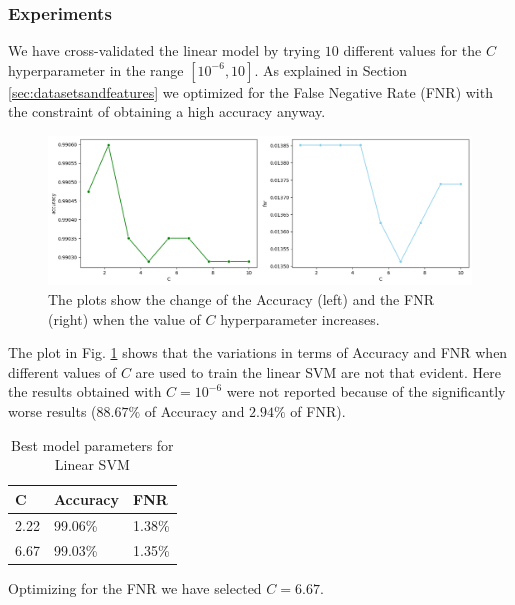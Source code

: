 \documentclass[twocolumn, switch]{article} %
\newcommand\x{0.7}
\begin{document}
\subsubsection{Experiments}
We have cross-validated the linear model by trying $10$ different values for the $C$ hyperparameter in the range $[10^{-6}, 10]$. As explained in Section \ref{sec:datasetsandfeatures} we optimized for the False Negative Rate (FNR) with the constraint of obtaining a high accuracy anyway.

\begin{figure}[ht!]
	\centering
	\includegraphics[width=\x\linewidth]{linear_svm_accuracy_fnr.png}
	\caption{The plots show the change of the Accuracy (left) and the FNR (right) when the value of $C$ hyperparameter increases.}
	\label{fig:linearsvm}
\end{figure}

The plot in Fig. \ref{fig:linearsvm} shows that the variations in terms of Accuracy and FNR when different values of $C$ are used to train the linear SVM are not that evident. Here the results obtained with $C=10^{-6}$ were not reported because of the significantly worse results ($88.67\%$ of Accuracy and $2.94\%$ of FNR). \\

\begin{table}[ht!]
	\centering
	{\small
		\begin{tabular}{|l|l|l|}
			\hline
			\textbf{C} & \textbf{Accuracy} & \textbf{FNR} \\ \hline
			2.22       & 99.06\%           & 1.38\%       \\ \hline
			6.67       & 99.03\%           & 1.35\%       \\ \hline
		\end{tabular}
	}
	\caption{Best model parameters for Linear SVM}
	\vspace{-6mm}
\end{table}

Optimizing for the FNR we have selected $C=6.67$.
\end{document}
